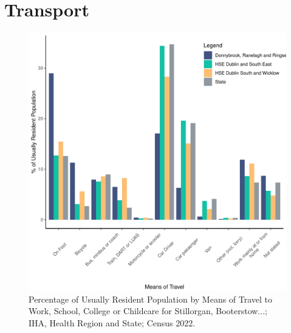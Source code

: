 \documentclass{article}
\begin{document}
\section{Transport}\label{sect:Trans}
\begin{figure}[H]
	\centering
	\includegraphics[width = 120mm]{../figures/TravelED.pdf}
	\caption{Percentage of Usually Resident Population by Means of Travel to Work, School, College or Childcare for Stillorgan, Booterstow...; IHA, Health Region and State; Census 2022.}
	\label{fig:vbnv}
	\end{figure}
\end{document}
